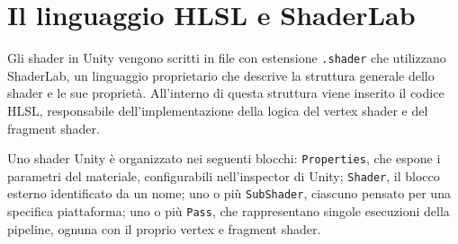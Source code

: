 \documentclass[12pt,a4paper,twoside]{book}
\begin{document}
\section{Il linguaggio HLSL e ShaderLab}
\label{sec:hlsl}

Gli shader in Unity vengono scritti in file con estensione \texttt{.shader} che utilizzano ShaderLab, un linguaggio proprietario che descrive la struttura generale dello shader e le sue proprietà. All'interno di questa struttura viene inserito il codice HLSL, responsabile dell'implementazione della logica del vertex shader e del fragment shader.

Uno shader Unity è organizzato nei seguenti blocchi: \texttt{Properties}, che espone i parametri del materiale, configurabili nell'inspector di Unity; \texttt{Shader}, il blocco esterno identificato da un nome; uno o più \texttt{SubShader}, ciascuno pensato per una specifica piattaforma; uno o più \texttt{Pass}, che rappresentano singole esecuzioni della pipeline, ognuna con il proprio vertex e fragment shader.
\end{document}
